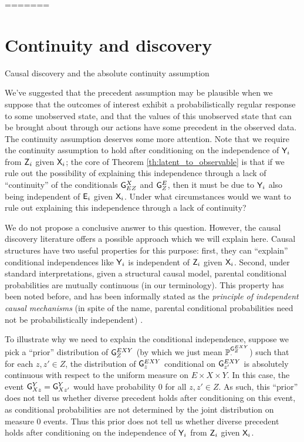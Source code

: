=======
\section{Continuity and discovery}{Causal discovery and the absolute continuity assumption}

We've suggested that the precedent assumption may be plausible when we suppose that the outcomes of interest exhibit a probabilistically regular response to some unobserved state, and that the values of this unobserved state that can be brought about through our actions have some precedent in the observed data. The continuity assumption deserves some more attention. Note that we require the continuity assumption to hold after conditioning on the independence of $\mathsf{Y}_i$ from $\mathsf{Z}_i$ given $\mathsf{X}_i$; the core of Theorem \ref{th:latent_to_observable} is that if we rule out the possibility of explaining this independence through a lack of ``continuity'' of the conditionals $\mathsf{G}^{X}_{EZ}$ and $\mathsf{G}^{E}_{Z}$, then it must be due to $\mathsf{Y}_i$ also being independent of $\mathsf{E}_i$ given $\mathsf{X}_i$. Under what circumstances would we want to rule out explaining this independence through a lack of continuity?

We do not propose a conclusive answer to this question. However, the causal discovery literature offers a possible approach which we will explain here. Causal structures have two useful properties for this purpose: first, they can ``explain'' conditional independences like $\mathsf{Y}_i$ is independent of $\mathsf{Z}_i$ given $\mathsf{X}_i$. Second, under standard interpretations, given a structural causal model, parental conditional probabilities are mutually continuous (in our terminology). This property has been noted before, and has been informally stated as the \emph{principle of independent causal mechanisms} (in spite of the name, parental conditional probabilities need not be probabilistically independent) \citep{lemeire_replacing_2013,peters_elements_2017}.

To illustrate why we need to explain the conditional independence, suppose we pick a ``prior'' distribution of $\mathsf{G}^{EXY}_{Z}$ (by which we just mean $\mathbb{P}_{\cdot}^{\mathsf{G}^{EXY}_{Z}}$) such that for each $z,z'\in Z$, the distribution of $\mathsf{G}^{EXY}_z$ conditional on $\mathsf{G}^{EXY}_{z'}$ is absolutely continuous with respect to the uniform measure on $E\times X\times Y$. In this case, the event $\mathsf{G}^Y_{Xz}=\mathsf{G}^Y_{Xz'}$ would have probability 0 for all $z,z'\in Z$. As such, this ``prior'' does not tell us whether diverse precedent holds after conditioning on this event, as conditional probabilities are not determined by the joint distribution on measure 0 events. Thus this prior does not tell us whether diverse precedent holds after conditioning on the independence of $\mathsf{Y}_i$ from $\mathsf{Z}_i$ given $\mathsf{X}_i$.

